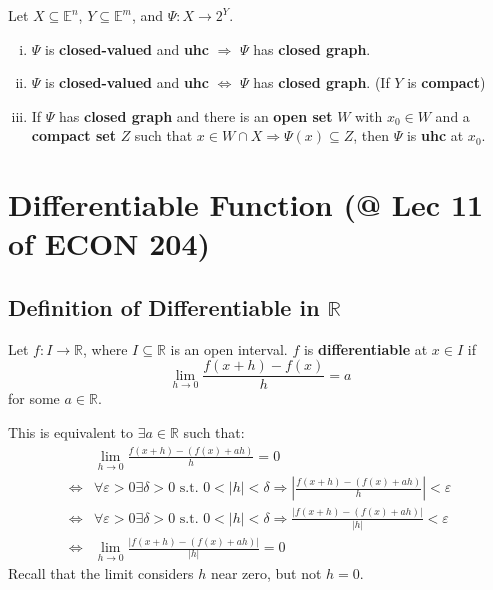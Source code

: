 \documentclass[11pt]{elegantbook}
\begin{document}
\begin{theorem}[Properties]
    Let $X\subseteq \mathbb{E}^n$, $Y\subseteq \mathbb{E}^m$, and $\Psi: X \rightarrow 2^Y$.
    \begin{enumerate}[(i).]
        \item $\Psi$ is \textbf{closed-valued} and \textbf{uhc} $\Rightarrow$ $\Psi$ has \textbf{closed graph}.
        \item $\Psi$ is \textbf{closed-valued} and \textbf{uhc} $\Leftrightarrow$ $\Psi$ has \textbf{closed graph}. (If $Y$ is \textbf{compact})
        \item If $\Psi$ has \textbf{closed graph} and there is an \textbf{open set} $W$ with $x_0 \in W$ and a \textbf{compact set} $Z$ such that $x \in W \cap X \Rightarrow \Psi(x) \subseteq Z$, then $\Psi$ is \textbf{uhc} at $x_0$.
    \end{enumerate}
\end{theorem}


\section{Differentiable Function \small{(@ Lec 11 of ECON 204)}}
\subsection{Definition of Differentiable in $\mathbb{R}$}
\begin{definition}
    \normalfont
    Let $f: I \rightarrow \mathbb{R}$, where $I \subseteq \mathbb{R}$ is an open interval. $f$ is \textbf{differentiable} at $x \in I$ if
    $$
    \lim _{h \rightarrow 0} \frac{f(x+h)-f(x)}{h}=a
    $$
    for some $a \in \mathbb{R}$.
\end{definition}
This is equivalent to $\exists a \in \mathbb{R}$ such that:
$$
\begin{aligned}
& \lim _{h \rightarrow 0} \frac{f(x+h)-(f(x)+a h)}{h}=0 \\
\Leftrightarrow & \forall \varepsilon>0 \exists \delta>0 \text { s.t. } 0<|h|<\delta \Rightarrow\left|\frac{f(x+h)-(f(x)+a h)}{h}\right|<\varepsilon \\
\Leftrightarrow & \forall \varepsilon>0 \exists \delta>0 \text { s.t. } 0<|h|<\delta \Rightarrow \frac{|f(x+h)-(f(x)+a h)|}{|h|}<\varepsilon \\
\Leftrightarrow & \lim _{h \rightarrow 0} \frac{|f(x+h)-(f(x)+a h)|}{|h|}=0
\end{aligned}
$$
Recall that the limit considers $h$ near zero, but not $h=0$.
\end{document}
